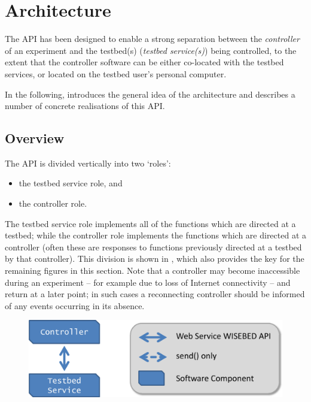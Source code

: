 	\section{Architecture}
The API has been designed to enable a strong separation between the {\em controller} of an experiment and the testbed(s) ({\em testbed service(s)}) being controlled, to the extent that the controller software can be either co-located with the testbed services, or located on the testbed user's personal computer.

In the following,  introduces the general idea of the architecture and  describes a number of concrete realisations of this API.

	\subsection{Overview}
	\label{ssec:arch-overview}
The API is divided vertically into two `roles':
\begin{itemize}
	\item the testbed service role, and 
	\item the controller role. 
\end{itemize}

The testbed service role implements all of the functions which are directed at a testbed; while the controller role implements the functions which are directed at a controller (often these are responses to functions previously directed at a testbed by that controller). This division is shown in , which also provides the key for the remaining figures in this section. Note that a controller may become inaccessible during an experiment -- for example due to loss of Internet connectivity -- and return at a later point; in such cases a reconnecting controller should be informed of any events occurring in its absence.

	\begin{figure}[htb]
		\centering
		\includegraphics[width=0.75\columnwidth]{images/architecture1}
		\caption{}
		\label{fig:architecture1}
	\end{figure}

